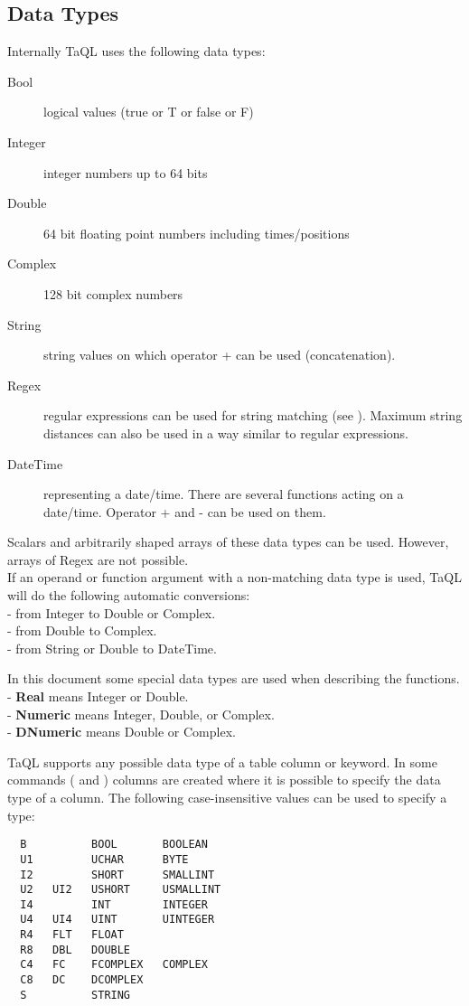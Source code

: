 \subsection{\label{TAQL:DATATYPES}Data Types}
Internally TaQL uses the following data types:
\begin{description}
  \item[Bool ] logical values (true or T or false or F)
  \item[Integer ] integer numbers up to 64 bits
  \item[Double ] 64 bit floating point numbers including times/positions
  \item[Complex ] 128 bit complex numbers
  \item[String ] string values on which operator + can be used (concatenation).
  \item[Regex ] regular expressions can be used for string
    matching (see ). Maximum string
    distances can also be used in a way similar to regular
    expressions. 
  \item[DateTime ] representing a date/time. There are several functions
       acting on a date/time. Operator + and - can be used on them.
\end{description}
Scalars and arbitrarily shaped arrays of these data types can be used.
However, arrays of Regex are not possible.
\\If an operand or function argument with a non-matching data type
is used, TaQL will do the following automatic conversions:
\\- from Integer to Double or Complex.
\\- from Double to Complex.
\\- from String or Double to DateTime.

In this document some special data types are used when describing the functions.
\\- \textbf{Real} means Integer or Double.
\\- \textbf{Numeric} means Integer, Double, or Complex.
\\- \textbf{DNumeric} means Double or Complex.

\label{TAQL:DATATYPESTRING}
TaQL supports any possible data type of a table column or keyword.
In some commands ( and
) columns are created where
it is possible to specify the data type of a column. 
The following case-insensitive values can be used to specify a type:
\begin{verbatim}
  B          BOOL       BOOLEAN
  U1         UCHAR      BYTE
  I2         SHORT      SMALLINT
  U2   UI2   USHORT     USMALLINT
  I4         INT        INTEGER
  U4   UI4   UINT       UINTEGER
  R4   FLT   FLOAT
  R8   DBL   DOUBLE
  C4   FC    FCOMPLEX   COMPLEX
  C8   DC    DCOMPLEX
  S          STRING
\end{verbatim}

